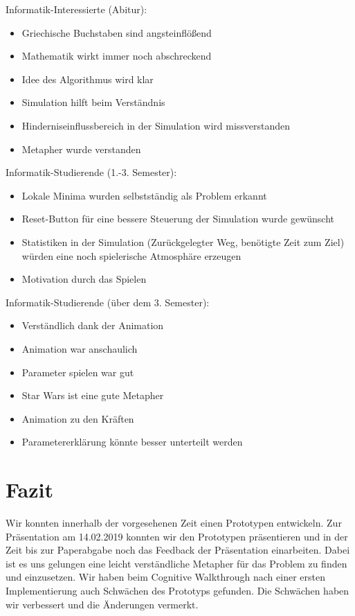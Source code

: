 Informatik-Interessierte (Abitur):
\begin{itemize}
	\item Griechische Buchstaben sind angsteinflößend
	\item Mathematik wirkt immer noch abschreckend
	\item Idee des Algorithmus wird klar
	\item Simulation hilft beim Verständnis
	\item Hinderniseinflussbereich in der Simulation wird missverstanden
	\item Metapher wurde verstanden
\end{itemize}

Informatik-Studierende (1.-3. Semester):
\begin{itemize}
	\item Lokale Minima wurden selbstständig als Problem erkannt
	\item Reset-Button für eine bessere Steuerung der Simulation wurde gewünscht
	\item Statistiken in der Simulation (Zurückgelegter Weg, benötigte Zeit zum Ziel) würden eine noch spielerische Atmosphäre erzeugen
	\item Motivation durch das Spielen
\end{itemize}

Informatik-Studierende (über dem  3. Semester):
\begin{itemize}
	\item Verständlich dank der Animation
	\item Animation war anschaulich
	\item Parameter spielen war gut
	\item Star Wars ist eine gute Metapher
	\item Animation zu den Kräften %
	\item Parametererklärung könnte besser unterteilt werden
\end{itemize}


\section{Fazit}
Wir konnten innerhalb der vorgesehenen Zeit einen Prototypen entwickeln.
Zur Präsentation am 14.02.2019 konnten wir den Prototypen präsentieren und in der Zeit bis zur Paperabgabe noch das Feedback der Präsentation einarbeiten.
Dabei ist es uns gelungen eine leicht verständliche Metapher für das Problem zu finden und einzusetzen. 
Wir haben beim Cognitive Walkthrough nach einer ersten Implementierung auch Schwächen des Prototyps gefunden. 
Die Schwächen haben wir verbessert und die Änderungen vermerkt.

